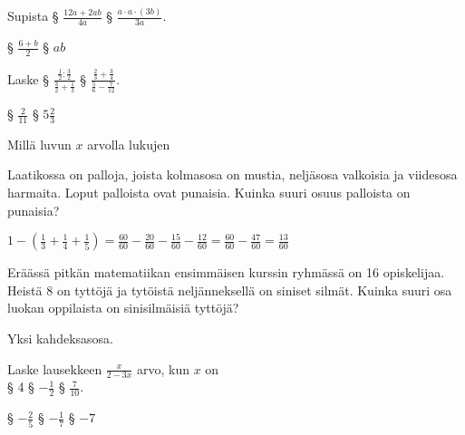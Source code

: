 \begin{tehtavasivu}
\begin{tehtava}
Supista 
§ $\frac{12a+2ab}{4a}$ 
§ $\frac{a\cdot a\cdot (3b)}{3a}$.
\begin{vastaus}
§ $\frac{6+b}{2}$
§ $ab$
\end{vastaus}
\end{tehtava}

\begin{tehtava}Laske
§ $\frac{\frac{1}{2}:\frac{3}{2}}{\frac{3}{2}+\frac{1}{3}}$ 
§ $\frac{\frac{2}{3}+\frac{3}{4}}{\frac{5}{6}-\frac{7}{12}}$.
\begin{vastaus}
§ $\frac{2}{11}$ 
§ $5\frac{2}{3}$
\end{vastaus}
\end{tehtava}

\begin{tehtava}
Millä luvun $x$ arvolla lukujen 
\begin{vastaus}
\end{vastaus}
\end{tehtava}

\begin{tehtava} 
        Laatikossa on palloja, joista kolmasosa on mustia, neljäsosa
        valkoisia ja viidesosa harmaita. Loput palloista ovat punaisia.
        Kuinka suuri osuus palloista on punaisia?
        
        \begin{vastaus}
            $1-(\frac{1}{3}+\frac{1}{4}+\frac{1}{5})
            = \frac{60}{60}-\frac{20}{60}-\frac{15}{60}-\frac{12}{60}
            = \frac{60}{60}-\frac{47}{60}
            = \frac{13}{60}$
        \end{vastaus}
    \end{tehtava}
    
\begin{tehtava} 
Eräässä pitkän matematiikan ensimmäisen kurssin ryhmässä on 16 opiskelijaa. Heistä 8 on tyttöjä ja tytöistä neljänneksellä on siniset silmät. Kuinka suuri osa luokan oppilaista on sinisilmäisiä tyttöjä?
        \begin{vastaus}
			Yksi kahdeksasosa.
        \end{vastaus}
\end{tehtava}

\begin{tehtava}
Laske lausekkeen $\frac{x}{2-3x}$ arvo, kun $x$ on \\
§ 4 
§ $-\frac{1}{2}$ 
§ $\frac{7}{10}$.
\begin{vastaus}
§ $-\frac{2}{5}$ 
§ $-\frac{1}{7}$ 
§ $-7$
\end{vastaus}
\end{tehtava}


\end{tehtavasivu}
